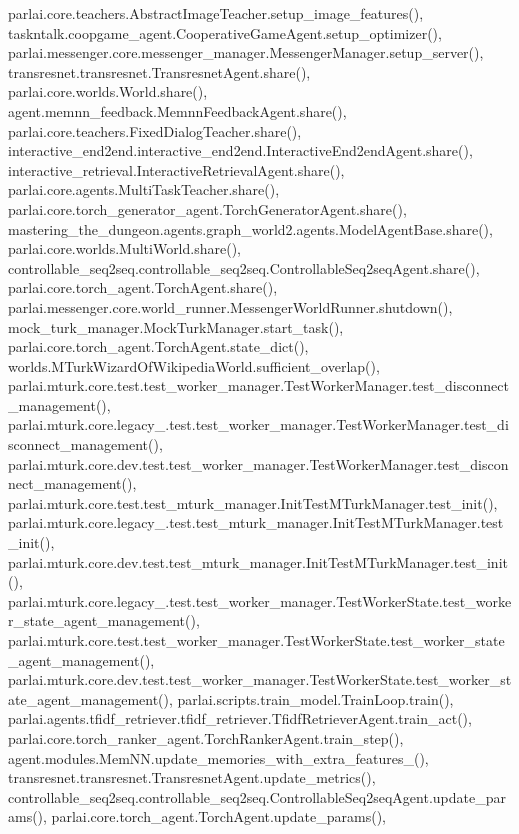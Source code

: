 parlai.\+core.\+teachers.\+Abstract\+Image\+Teacher.\+setup\+\_\+image\+\_\+features(), taskntalk.\+coopgame\+\_\+agent.\+Cooperative\+Game\+Agent.\+setup\+\_\+optimizer(), parlai.\+messenger.\+core.\+messenger\+\_\+manager.\+Messenger\+Manager.\+setup\+\_\+server(), transresnet.\+transresnet.\+Transresnet\+Agent.\+share(), parlai.\+core.\+worlds.\+World.\+share(), agent.\+memnn\+\_\+feedback.\+Memnn\+Feedback\+Agent.\+share(), parlai.\+core.\+teachers.\+Fixed\+Dialog\+Teacher.\+share(), interactive\+\_\+end2end.\+interactive\+\_\+end2end.\+Interactive\+End2end\+Agent.\+share(), interactive\+\_\+retrieval.\+Interactive\+Retrieval\+Agent.\+share(), parlai.\+core.\+agents.\+Multi\+Task\+Teacher.\+share(), parlai.\+core.\+torch\+\_\+generator\+\_\+agent.\+Torch\+Generator\+Agent.\+share(), mastering\+\_\+the\+\_\+dungeon.\+agents.\+graph\+\_\+world2.\+agents.\+Model\+Agent\+Base.\+share(), parlai.\+core.\+worlds.\+Multi\+World.\+share(), controllable\+\_\+seq2seq.\+controllable\+\_\+seq2seq.\+Controllable\+Seq2seq\+Agent.\+share(), parlai.\+core.\+torch\+\_\+agent.\+Torch\+Agent.\+share(), parlai.\+messenger.\+core.\+world\+\_\+runner.\+Messenger\+World\+Runner.\+shutdown(), mock\+\_\+turk\+\_\+manager.\+Mock\+Turk\+Manager.\+start\+\_\+task(), parlai.\+core.\+torch\+\_\+agent.\+Torch\+Agent.\+state\+\_\+dict(), worlds.\+M\+Turk\+Wizard\+Of\+Wikipedia\+World.\+sufficient\+\_\+overlap(), parlai.\+mturk.\+core.\+test.\+test\+\_\+worker\+\_\+manager.\+Test\+Worker\+Manager.\+test\+\_\+disconnect\+\_\+management(), parlai.\+mturk.\+core.\+legacy\+\_.\+test.\+test\+\_\+worker\+\_\+manager.\+Test\+Worker\+Manager.\+test\+\_\+disconnect\+\_\+management(), parlai.\+mturk.\+core.\+dev.\+test.\+test\+\_\+worker\+\_\+manager.\+Test\+Worker\+Manager.\+test\+\_\+disconnect\+\_\+management(), parlai.\+mturk.\+core.\+test.\+test\+\_\+mturk\+\_\+manager.\+Init\+Test\+M\+Turk\+Manager.\+test\+\_\+init(), parlai.\+mturk.\+core.\+legacy\+\_.\+test.\+test\+\_\+mturk\+\_\+manager.\+Init\+Test\+M\+Turk\+Manager.\+test\+\_\+init(), parlai.\+mturk.\+core.\+dev.\+test.\+test\+\_\+mturk\+\_\+manager.\+Init\+Test\+M\+Turk\+Manager.\+test\+\_\+init(), parlai.\+mturk.\+core.\+legacy\+\_.\+test.\+test\+\_\+worker\+\_\+manager.\+Test\+Worker\+State.\+test\+\_\+worker\+\_\+state\+\_\+agent\+\_\+management(), parlai.\+mturk.\+core.\+test.\+test\+\_\+worker\+\_\+manager.\+Test\+Worker\+State.\+test\+\_\+worker\+\_\+state\+\_\+agent\+\_\+management(), parlai.\+mturk.\+core.\+dev.\+test.\+test\+\_\+worker\+\_\+manager.\+Test\+Worker\+State.\+test\+\_\+worker\+\_\+state\+\_\+agent\+\_\+management(), parlai.\+scripts.\+train\+\_\+model.\+Train\+Loop.\+train(), parlai.\+agents.\+tfidf\+\_\+retriever.\+tfidf\+\_\+retriever.\+Tfidf\+Retriever\+Agent.\+train\+\_\+act(), parlai.\+core.\+torch\+\_\+ranker\+\_\+agent.\+Torch\+Ranker\+Agent.\+train\+\_\+step(), agent.\+modules.\+Mem\+N\+N.\+update\+\_\+memories\+\_\+with\+\_\+extra\+\_\+features\+\_\+(), transresnet.\+transresnet.\+Transresnet\+Agent.\+update\+\_\+metrics(), controllable\+\_\+seq2seq.\+controllable\+\_\+seq2seq.\+Controllable\+Seq2seq\+Agent.\+update\+\_\+params(), parlai.\+core.\+torch\+\_\+agent.\+Torch\+Agent.\+update\+\_\+params(), 